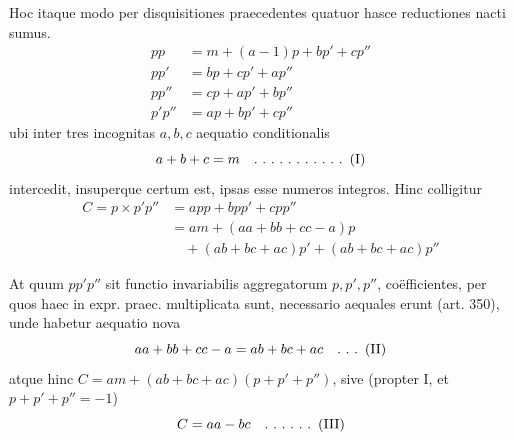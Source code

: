Hoc itaque modo per disquisitiones praecedentes quatuor hasce reductiones nacti sumus.
\[\begin{aligned}pp&=m+(a-1)p+bp'+cp''\\pp'&=bp+cp'+ap''\\pp''&=cp+ap'+bp''\\p'p''&=ap+bp'+cp''\end{aligned}\] ubi inter tres incognitas \(a,\allowbreak b,\allowbreak c\) aequatio conditionalis \[a+b+c=m\quad \ldotp\,\ldotp\,\ldotp\,\ldotp\,\ldotp\,\ldotp\,\ldotp\,\ldotp\,\ldotp\,\ldotp\,\ldotp\ (\mathrm{I})\] intercedit, insuperque certum est, ipsas esse numeros integros. Hinc colligitur \[\begin{aligned}C=p\times p'p''&=app+bpp'+cpp''\\&=am+(aa+bb+cc-a)p\\&\quad+(ab+bc+ac)p'+(ab+bc+ac)p''\end{aligned}\]

At quum \(pp'p''\) sit functio invariabilis aggregatorum \(p,\allowbreak p',\allowbreak p''\), coëfficientes, per quos haec in expr. praec. multiplicata sunt, necessario aequales erunt (art. 350), unde habetur aequatio nova \[aa+bb+cc-a=ab+bc+ac\quad \ldotp\,\ldotp\,\ldotp\ (\mathrm{II})\] atque hinc \(C=am+(ab+bc+ac)(p+p'+p'')\), sive (propter I, et \(p+p'+p''=-1\)) \[C=aa-bc\quad \ldotp\,\ldotp\,\ldotp\,\ldotp\,\ldotp\,\ldotp\ (\mathrm{III})\]

